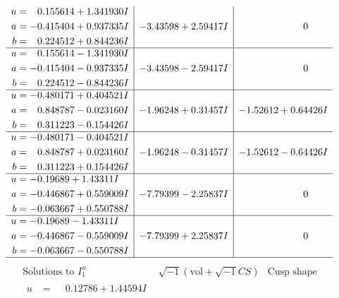 \documentclass[1p]{elsarticle_modified}
\theoremstyle{definition}
\newcommand{\I}{\sqrt{-1}}
\begin{document}
$$\begin{array}{c|c|c}
\begin{aligned}
u &= \phantom{-}0.155614 + 1.341930 I \\
a &= -0.415404 + 0.937335 I \\
b &= \phantom{-}0.224512 + 0.844236 I\end{aligned}
 & -3.43598 + 2.59417 I & \phantom{-0.000000 } 0 \\ \hline\begin{aligned}
u &= \phantom{-}0.155614 - 1.341930 I \\
a &= -0.415404 - 0.937335 I \\
b &= \phantom{-}0.224512 - 0.844236 I\end{aligned}
 & -3.43598 - 2.59417 I & \phantom{-0.000000 } 0 \\ \hline\begin{aligned}
u &= -0.480171 + 0.404521 I \\
a &= \phantom{-}0.848787 - 0.023160 I \\
b &= \phantom{-}0.311223 - 0.154426 I\end{aligned}
 & -1.96248 + 0.31457 I & -1.52612 + 0.64426 I \\ \hline\begin{aligned}
u &= -0.480171 - 0.404521 I \\
a &= \phantom{-}0.848787 + 0.023160 I \\
b &= \phantom{-}0.311223 + 0.154426 I\end{aligned}
 & -1.96248 - 0.31457 I & -1.52612 - 0.64426 I \\ \hline\begin{aligned}
u &= -0.19689 + 1.43311 I \\
a &= -0.446867 + 0.559009 I \\
b &= -0.063667 + 0.550788 I\end{aligned}
 & -7.79399 - 2.25837 I & \phantom{-0.000000 } 0 \\ \hline\begin{aligned}
u &= -0.19689 - 1.43311 I \\
a &= -0.446867 - 0.559009 I \\
b &= -0.063667 - 0.550788 I\end{aligned}
 & -7.79399 + 2.25837 I & \phantom{-0.000000 } 0\\
 \hline 
 \end{array}$$\newpage$$\begin{array}{c|c|c}  
\text{Solutions to }I^u_{1}& \I (\text{vol} + \sqrt{-1}CS) & \text{Cusp shape}\\
 \hline 
\begin{aligned}
u &= \phantom{-}0.12786 + 1.44594 I \\

\end{aligned}
\end{array}$$
\end{document}
